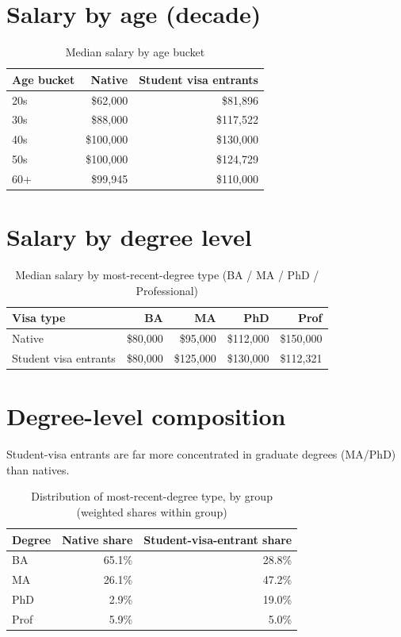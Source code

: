 \documentclass[11pt]{article}
\begin{document}
\section{Salary by age (decade)}
\begin{table}[H]
\centering
\caption{Median salary by age bucket}

\begin{tabular}{lrr}
\toprule
Age bucket & Native & Student visa entrants\\
\midrule
20s & \$62,000 & \$81,896\\
30s & \$88,000 & \$117,522\\
40s & \$100,000 & \$130,000\\
50s & \$100,000 & \$124,729\\
60+ & \$99,945 & \$110,000\\
\bottomrule
\end{tabular}
\end{table}
\section{Salary by degree level}
\begin{table}[H]
\centering
\caption{Median salary by most-recent-degree type (BA / MA / PhD / Professional)}

\begin{tabular}{lrrrr}
\toprule
Visa type & BA & MA & PhD & Prof\\
\midrule
Native & \$80,000 & \$95,000 & \$112,000 & \$150,000\\
Student visa entrants & \$80,000 & \$125,000 & \$130,000 & \$112,321\\
\bottomrule
\end{tabular}
\end{table}
\section{Degree-level composition}
Student-visa entrants are far more concentrated in graduate degrees (MA/PhD) than natives.
\begin{table}[H]
\centering
\caption{Distribution of most-recent-degree type, by group (weighted shares within group)}

\begin{tabular}{lrr}
\toprule
Degree & Native share & Student-visa-entrant share\\
\midrule
BA & 65.1\% & 28.8\%\\
MA & 26.1\% & 47.2\%\\
PhD & 2.9\% & 19.0\%\\
Prof & 5.9\% & 5.0\%\\
\bottomrule
\end{tabular}
\end{table}
\end{document}
